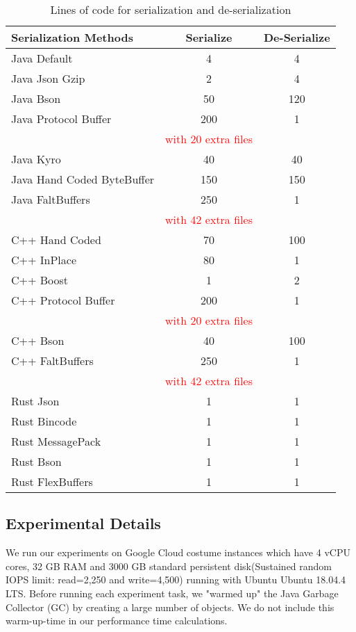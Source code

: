 \begin{table}
	\centering
	\caption{Lines of code for serialization and de-serialization  }
	\label{tbl:object_size}
	\begin{adjustbox}{width=\columnwidth,center}	
		
		\begin{tabular}{|l|c|c|} \hline
			\textbf{Serialization Methods} & \textbf{Serialize} &  \textbf{De-Serialize}   \\ \hline
			Java Default  & 4  & 4 \\ \hline	
			Java Json Gzip  & 2 & 4\\ \hline	
			Java Bson  & 50  & 120 \\ \hline	
			Java Protocol Buffer  & 200 & 1 \\ 
			                      &\textcolor{red}{with 20 extra files} &  \\ \hline	
			Java Kyro  & 40 & 40 \\ \hline	
			Java Hand Coded ByteBuffer  & 150 & 150 \\ \hline	
			Java FaltBuffers  & 250 & 1 \\ 
							  &\textcolor{red}{with 42 extra files} &  \\ \hline	
			C++ Hand Coded  & 70  & 100 \\ \hline	
			C++ InPlace  & 80 & 1 \\ \hline	
			C++ Boost  & 1 & 2 \\ \hline	
			C++ Protocol Buffer  & 200 & 1\\ 
									&\textcolor{red}{with 20 extra files} &  \\ \hline	
			C++ Bson  & 40 & 100 \\ \hline	
			C++ FaltBuffers  & 250  & 1 \\ 
									&\textcolor{red}{with 42 extra files} &  \\ 	\hline	
			Rust Json  & 1 & 1 \\ \hline
			Rust Bincode  & 1 & 1\\ \hline			
			Rust MessagePack  & 1 & 1\\ \hline			
			Rust Bson  & 1 & 1\\ \hline			
			Rust FlexBuffers  & 1 & 1\\						
			\hline\end{tabular}
	\end{adjustbox}
\end{table}




\subsection{Experimental Details}
We run our experiments on Google Cloud costume instances which have 4 vCPU cores, 32 GB RAM and 3000 GB standard persistent disk(Sustained random IOPS limit: read=2,250 and write=4,500) running with Ubuntu Ubuntu 18.04.4 LTS. Before running each experiment task, we "warmed up" the Java Garbage Collector (GC) by creating a large number of objects. We do not include this warm-up-time in our performance time calculations.

